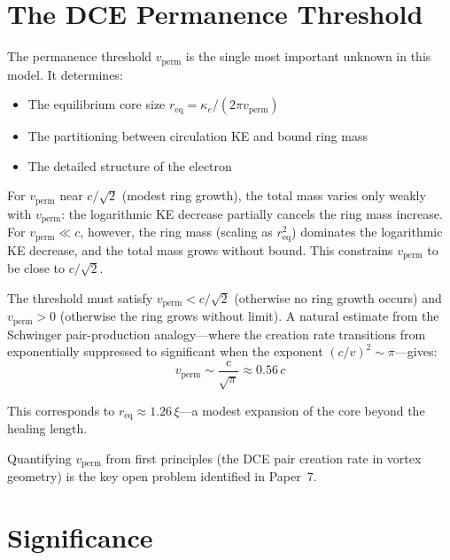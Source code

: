 \documentclass[12pt,letterpaper]{article}
\begin{document}
\section{The DCE Permanence Threshold}
\label{sec:threshold}

The permanence threshold $v_{\mathrm{perm}}$ is the single most important
unknown in this model.  It determines:
\begin{itemize}[leftmargin=2em]
  \item The equilibrium core size $r_{\mathrm{eq}} = \kappa_e/(2\pi v_{\mathrm{perm}})$
  \item The partitioning between circulation KE and bound ring mass
  \item The detailed structure of the electron
\end{itemize}

For $v_{\mathrm{perm}}$ near $c/\sqrt{2}$ (modest ring growth), the total
mass varies only weakly with $v_{\mathrm{perm}}$: the logarithmic KE
decrease partially cancels the ring mass increase.  For
$v_{\mathrm{perm}} \ll c$, however, the ring mass (scaling as
$r_{\mathrm{eq}}^2$) dominates the logarithmic KE decrease, and the total
mass grows without bound.  This constrains $v_{\mathrm{perm}}$ to be close
to $c/\sqrt{2}$.

The threshold must satisfy $v_{\mathrm{perm}} < c/\sqrt{2}$ (otherwise no
ring growth occurs) and $v_{\mathrm{perm}} > 0$ (otherwise the ring grows
without limit).  A natural estimate from the Schwinger pair-production
analogy---where the creation rate transitions from exponentially suppressed
to significant when the exponent $(c/v)^2 \sim \pi$---gives:
%
\begin{equation}
  v_{\mathrm{perm}} \sim \frac{c}{\sqrt{\pi}} \approx 0.56\,c
  \label{eq:threshold-estimate}
\end{equation}

This corresponds to $r_{\mathrm{eq}} \approx 1.26\,\xi$---a modest expansion
of the core beyond the healing length.

Quantifying $v_{\mathrm{perm}}$ from first principles (the DCE pair creation
rate in vortex geometry) is the key open problem identified in Paper~7.


\section{Significance}
\label{sec:significance}
\end{document}
